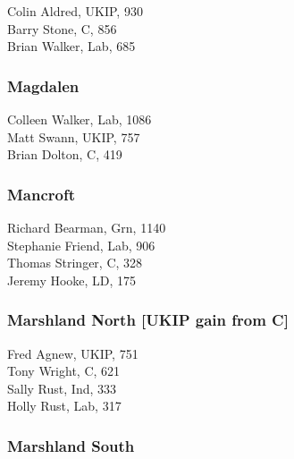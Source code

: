 \documentclass[a4paper,openany,10pt]{book}
\begin{document}


Colin Aldred, UKIP, 930\\
Barry Stone, C, 856\\
Brian Walker, Lab, 685\\


\subsubsection*{Magdalen}



Colleen Walker, Lab, 1086\\
Matt Swann, UKIP, 757\\
Brian Dolton, C, 419\\


\subsubsection*{Mancroft}



Richard Bearman, Grn, 1140\\
Stephanie Friend, Lab, 906\\
Thomas Stringer, C, 328\\
Jeremy Hooke, LD, 175\\


\subsubsection*{Marshland North \hspace*{\fill}\nolinebreak[1]%
\enspace\hspace*{\fill}
[UKIP gain from C]}



Fred Agnew, UKIP, 751\\
Tony Wright, C, 621\\
Sally Rust, Ind, 333\\
Holly Rust, Lab, 317\\


\subsubsection*{Marshland South}

\end{document}
